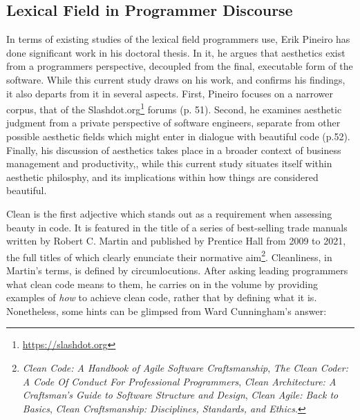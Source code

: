 \subsection{Lexical Field in Programmer Discourse} %


In terms of existing studies of the lexical field programmers use, Erik Pineiro has done significant work in his doctoral thesis. In it, he argues that aesthetics exist from a programmers perspective, decoupled from the final, executable form of the software. While this current study draws on his work, and confirms his findings, it also departs from it in several aspects. First, Pineiro focuses on a narrower corpus, that of the Slashdot.org\footnote{\url{https://slashdot.org}} forums\cite{pineiro_aesthetics_2003} (p. 51). Second, he examines aesthetic judgment from a private perspective of software engineers, separate from other possible aesthetic fields which might enter in dialogue with beautiful code\cite{pineiro_aesthetics_2003} (p.52). Finally, his discussion of aesthetics takes place in a broader context of business management and productivity,, while this current study situates itself within aesthetic philosphy, and its implications within how things are considered beautiful.

\vspace*{1\baselineskip}

Clean is the first adjective which stands out as a requirement when assessing beauty in code. It is featured in the title of a series of best-selling trade manuals written by Robert C. Martin and published by Prentice Hall from 2009 to 2021, the full titles of which clearly enunciate their normative aim\footnote{\emph{Clean Code: A Handbook of Agile Software Craftsmanship}, \emph{The Clean Coder: A Code Of Conduct For Professional Programmers}, \emph{Clean Architecture: A Craftsman's Guide to Software Structure and Design}, \emph{Clean Agile: Back to Basics}, \emph{Clean Craftsmanship: Disciplines, Standards, and Ethics}.}. Cleanliness, in Martin's terms, is defined by circumlocutions. After asking leading programmers what clean code means to them, he carries on in the volume by providing examples of \emph{how} to achieve clean code, rather that by defining what it is. Nonetheless, some hints can be glimpsed from Ward Cunningham's answer:

